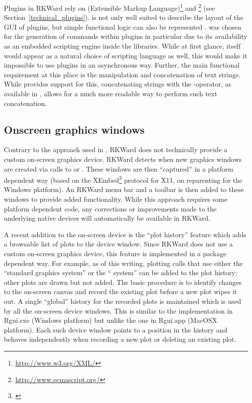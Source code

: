Plugins in RKWard rely on  (Extensible Markup Language)\footnote{\url{http://www.w3.org/XML/}}
and \footnote{\url{http://www.ecmascript.org/}} (see Section~\ref{technical_plugins}).  is not
only well suited to describe the layout of the GUI of plugins, but simple
functional logic can also be represented \citep{Visne2009}.  was
chosen for the generation of  commands within plugins in particular due to its
availability as an embedded scripting engine inside the  libraries. While at
first glance,  itself would appear as a natural choice of scripting language as
well, this would make it impossible to use plugins in an asynchronous way.
Further, the main functional requirement at this place is the manipulation and
concatenation of text strings. While  provides support for this, concatenating
strings with the \code{+}-operator, as available in , allows for a much
more readable way to perform such text concatenation.

\subsection[technical_graphics]{Onscreen graphics windows}
Contrary to the approach used in  \citep{HelbigTheus2005}, RKWard does
not technically provide a custom on-screen graphics device. RKWard detects when
new graphics windows are created via calls to  or . These windows
are then “captured” in a platform dependent way (based on the XEmbed\footnote{\citep{Ettrich2002}} protocol
for X11, on reparenting for the Windows platform). An RKWard menu bar and a
toolbar is then added to these windows to provide added functionality. While
this approach requires some platform dependent code, any corrections or
improvements made to the underlying  native devices will automatically be
available in RKWard.

A recent addition to the on-screen device is the ``plot history'' feature which
adds a browsable list of plots to the device window. Since RKWard does not use a
custom on-screen graphics device, this feature is implemented in a package
dependent way. For example, as of this writing, plotting calls that use either
the ``standard graphics system'' or the `` system'' can be added to the plot
history; other plots are drawn but not added. The basic procedure is to identify
changes to the on-screen canvas and record the existing plot before a new plot
wipes it out. A single ``global'' history for the recorded plots is maintained
which is used by all the on-screen device windows. This is similar to the
implementation in Rgui.exe (Windows platform) but unlike the one in Rgui.app
(MacOSX platform). Each such device window points to a position in the history
and behaves independently when recording a new plot or deleting an existing
plot.

